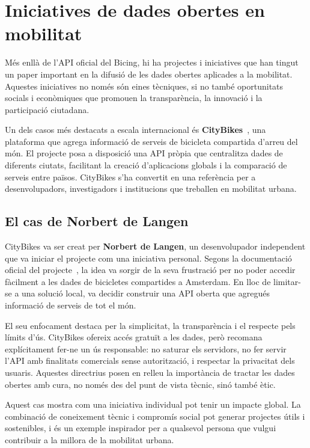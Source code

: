 \section{Iniciatives de dades obertes en mobilitat}
Més enllà de l’API oficial del Bicing, hi ha projectes i iniciatives que han tingut un paper important en la difusió de les dades obertes aplicades a la mobilitat.
Aquestes iniciatives no només són eines tècniques, si no també oportunitats socials i econòmiques que promouen la transparència, la innovació i la participació ciutadana.

Un dels casos més destacats a escala internacional és \textbf{CityBikes}~\cite{citybikes}, una plataforma que agrega informació de serveis de bicicleta compartida d’arreu del món.
El projecte posa a disposició una API pròpia que centralitza dades de diferents ciutats, facilitant la creació d’aplicacions globals i la comparació de serveis entre països.
CityBikes s’ha convertit en una referència per a desenvolupadors, investigadors i institucions que treballen en mobilitat urbana.

\subsection{El cas de Norbert de Langen}
CityBikes va ser creat per \textbf{Norbert de Langen}, un desenvolupador independent que va iniciar el projecte com una iniciativa personal.
Segons la documentació oficial del projecte~\cite{citybikes-docs}, la idea va sorgir de la seva frustració per no poder accedir fàcilment a les dades de bicicletes compartides a Amsterdam.
En lloc de limitar-se a una solució local, va decidir construir una API oberta que agregués informació de serveis de tot el món.

El seu enfocament destaca per la simplicitat, la transparència i el respecte pels límits d’ús.
CityBikes ofereix accés gratuït a les dades, però recomana explícitament fer-ne un ús responsable: no saturar els servidors, no fer servir l’API amb finalitats comercials sense autorització, i respectar la privacitat dels usuaris.
Aquestes directrius posen en relleu la importància de tractar les dades obertes amb cura, no només des del punt de vista tècnic, sinó també ètic.

Aquest cas mostra com una iniciativa individual pot tenir un impacte global.
La combinació de coneixement tècnic i compromís social pot generar projectes útils i sostenibles, i és un exemple inspirador per a qualsevol persona que vulgui contribuir a la millora de la mobilitat urbana.

